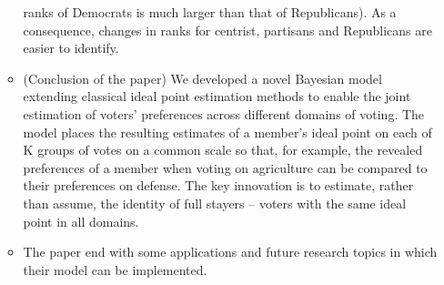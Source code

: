\documentclass[a4paper,12pt]{article}
\begin{document}
\begin{enumerate}
\begin{itemize}
ranks of Democrats is much larger than that of Republicans). As a consequence, changes in ranks for centrist, partisans and Republicans are easier to identify.
\item (Conclusion of the paper) We developed a novel Bayesian model extending classical ideal point estimation methods to enable the joint estimation of voters’ preferences across different domains of voting. The model places the resulting estimates of a member’s ideal point on each of K groups of votes on a common scale so that, for example, the revealed preferences of a member when voting on agriculture can be compared to their preferences on defense. The key innovation is to estimate, rather than assume, the identity of full stayers – voters with the same ideal point in all domains. 
\item The paper end with some applications and future research topics in which their model can be implemented.  

\end{itemize}



\newpage





\end{enumerate}
\end{document}
